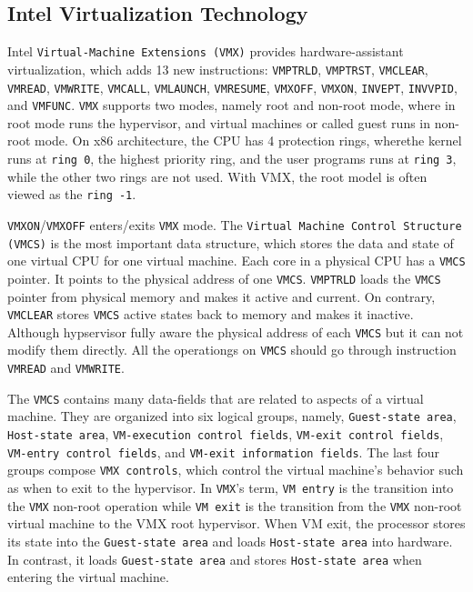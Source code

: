 \subsection{Intel Virtualization Technology}

Intel \texttt{Virtual-Machine Extensions (VMX)} provides hardware-assistant virtualization, which adds 13 new instructions: \texttt{VMPTRLD}, \texttt{VMPTRST}, \texttt{VMCLEAR}, \texttt{VMREAD}, \texttt{VMWRITE}, \texttt{VMCALL}, \texttt{VMLAUNCH}, \texttt{VMRESUME}, \texttt{VMXOFF}, \texttt{VMXON}, \texttt{INVEPT}, \texttt{INVVPID}, and \texttt{VMFUNC}. \texttt{VMX} supports two modes, namely root and non-root mode, where in root mode runs the hypervisor, and virtual machines or called guest runs in non-root mode. On x86 architecture, the CPU has 4 protection rings, wherethe kernel runs at \texttt{ring 0}, the highest priority ring, and the user programs runs at \texttt{ring 3}, while the other two rings are not used. With VMX, the root model is often viewed as the \texttt{ring -1}. 

\texttt{VMXON}/\texttt{VMXOFF} enters/exits \texttt{VMX} mode. The \texttt{Virtual Machine Control Structure (VMCS)} is the most important data structure, which stores the data and state of one virtual CPU for one virtual machine. Each core in a physical CPU has a \texttt{VMCS} pointer. It points to the physical address of one \texttt{VMCS}. \texttt{VMPTRLD} loads the \texttt{VMCS} pointer from physical memory and makes it active and current. On contrary, \texttt{VMCLEAR} stores \texttt{VMCS} active states back to memory and makes it inactive. Although hypservisor fully aware the physical address of each \texttt{VMCS} but it can not modify them directly. All the operationgs on \texttt{VMCS} should go through instruction \texttt{VMREAD} and \texttt{VMWRITE}. 

The \texttt{VMCS} contains many data-fields that are related to aspects of a virtual machine. They are organized into six logical groups, namely, \texttt{Guest-state area}, \texttt{Host-state area}, \texttt{VM-execution control fields}, \texttt{VM-exit control fields}, \texttt{VM-entry control fields}, and \texttt{VM-exit information fields}. The last four groups compose \texttt{VMX controls}, which control the virtual machine's behavior such as when to exit to the hypervisor. In \texttt{VMX}'s term, \texttt{VM entry} is the transition into the \texttt{VMX} non-root operation while \texttt{VM exit} is the transition from the \texttt{VMX} non-root virtual machine to the VMX root  hypervisor. When VM exit, the processor stores its state into the \texttt{Guest-state area} and loads \texttt{Host-state area} into hardware. In contrast, it loads \texttt{Guest-state area} and stores \texttt{Host-state area} when entering the virtual machine.

